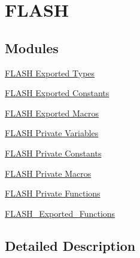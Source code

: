 \hypertarget{group___f_l_a_s_h}{}\section{F\+L\+A\+SH}
\label{group___f_l_a_s_h}
\subsection*{Modules}
\begin{DoxyCompactItemize}
\item 
\hyperlink{group___f_l_a_s_h___exported___types}{F\+L\+A\+S\+H Exported Types}
\item 
\hyperlink{group___f_l_a_s_h___exported___constants}{F\+L\+A\+S\+H Exported Constants}
\item 
\hyperlink{group___f_l_a_s_h___exported___macros}{F\+L\+A\+S\+H Exported Macros}
\item 
\hyperlink{group___f_l_a_s_h___private___variables}{F\+L\+A\+S\+H Private Variables}
\item 
\hyperlink{group___f_l_a_s_h___private___constants}{F\+L\+A\+S\+H Private Constants}
\item 
\hyperlink{group___f_l_a_s_h___private___macros}{F\+L\+A\+S\+H Private Macros}
\item 
\hyperlink{group___f_l_a_s_h___private___functions}{F\+L\+A\+S\+H Private Functions}
\item 
\hyperlink{group___f_l_a_s_h___exported___functions}{F\+L\+A\+S\+H\+\_\+\+Exported\+\_\+\+Functions}
\end{DoxyCompactItemize}


\subsection{Detailed Description}

